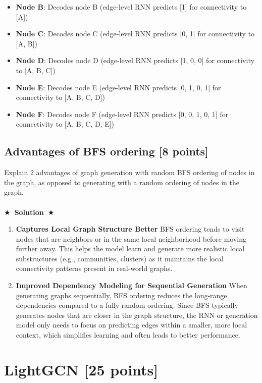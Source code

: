 \documentclass[11pt]{article}
\newcommand{\Solution}[1]{{\medskip \color{red} \bf $\bigstar$~\sf \textbf{Solution}~$\bigstar$ \sf #1 } \bigskip}
\begin{document}
\begin{itemize}
    \item \textbf{Node B}: Decodes node B (edge-level RNN predicts [1] for connectivity to [A])
    \item \textbf{Node C}: Decodes node C (edge-level RNN predicts [0, 1] for connectivity to [A, B])
    \item \textbf{Node D}: Decodes node D (edge-level RNN predicts [1, 0, 0] for connectivity to [A, B, C])
    \item \textbf{Node E}: Decodes node E (edge-level RNN predicts [0, 1, 0, 1] for connectivity to [A, B, C, D])
    \item \textbf{Node F}: Decodes node F (edge-level RNN predicts [0, 0, 1, 0, 1] for connectivity to [A, B, C, D, E])
\end{itemize}

\subsection{Advantages of BFS ordering [8 points]}
Explain 2 advantages of graph generation with random BFS ordering of nodes in
the graph, as opposed to generating with a random ordering of nodes in the graph.\\
\\
\Solution{}

\begin{enumerate}
    \item \textbf{Captures Local Graph Structure Better}
BFS ordering tends to visit nodes that are neighbors or in the same local neighborhood before moving further away. This helps the model learn and generate more realistic local substructures (e.g., communities, clusters) as it maintains the local connectivity patterns present in real-world graphs.
    \item \textbf{Improved Dependency Modeling for Sequential Generation}
When generating graphs sequentially, BFS ordering reduces the long-range dependencies compared to a fully random ordering. Since BFS typically generates nodes that are closer in the graph structure, the RNN or generation model only needs to focus on predicting edges within a smaller, more local context, which simplifies learning and often leads to better performance.
\end{enumerate}

\section{LightGCN [25 points]}
\end{document}

